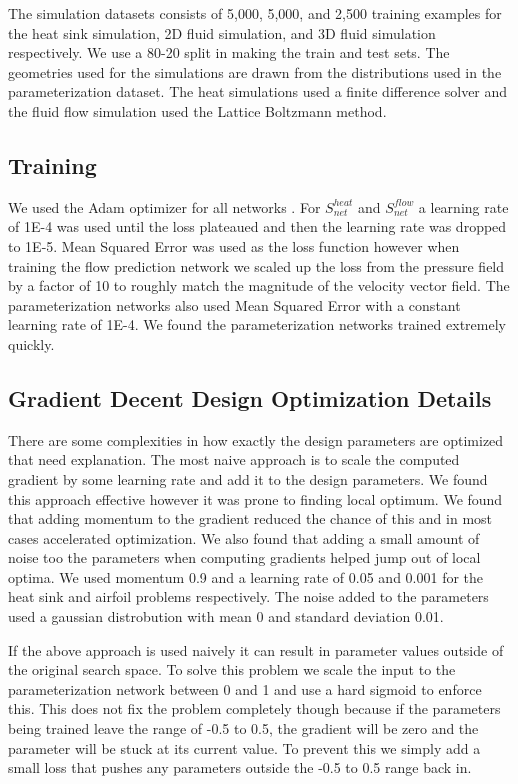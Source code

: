 \documentclass{article} %
\begin{document}
The simulation datasets consists of 5,000, 5,000, and 2,500 training examples for the heat sink simulation, 2D fluid simulation, and 3D fluid simulation respectively. We use a 80-20 split in making the train and test sets. The geometries used for the simulations are drawn from the distributions used in the parameterization dataset. The heat simulations used a finite difference solver and the fluid flow simulation used the Lattice Boltzmann method. 

\subsection{Training}

We used the Adam optimizer for all networks \cite{kingma2014adam}. For $S^{heat}_{net}$ and $S^{flow}_{net}$ a learning rate of 1E-4 was used until the loss plateaued and then the learning rate was dropped to 1E-5. Mean Squared Error was used as the loss function however when training the flow prediction network we scaled up the loss from the pressure field by a factor of 10 to roughly match the magnitude of the velocity vector field. The parameterization networks also used Mean Squared Error with a constant learning rate of 1E-4. We found the parameterization networks trained extremely quickly.

\subsection{Gradient Decent Design Optimization Details}

There are some complexities in how exactly the design parameters are optimized that need explanation. The most naive approach is to scale the computed gradient by some learning rate and add it to the design parameters. We found this approach effective however it was prone to finding local optimum. We found that adding momentum to the gradient reduced the chance of this and in most cases accelerated optimization. We also found that adding a small amount of noise too the parameters when computing gradients helped jump out of local optima. We used momentum 0.9 and a learning rate of 0.05 and 0.001 for the heat sink and airfoil problems respectively. The noise added to the parameters used a gaussian distrobution with mean 0 and standard deviation 0.01.

If the above approach is used naively it can result in parameter values outside of the original search space. To solve this problem we scale the input to the parameterization network between 0 and 1 and use a hard sigmoid to enforce this. This does not fix the problem completely though because if the parameters being trained leave the range of -0.5 to 0.5, the gradient will be zero and the parameter will be stuck at its current value. To prevent this we simply add a small loss that pushes any parameters outside the -0.5 to 0.5 range back in.
\end{document}
